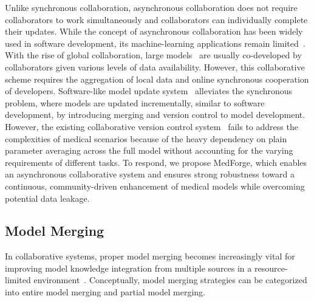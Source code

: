 Unlike synchronous collaboration, asynchronous collaboration does not require collaborators to work simultaneously and collaborators can individually complete their updates.
While the concept of asynchronous collaboration has been widely used in software development, its machine-learning applications remain limited~\cite{kandpal2023git, raffel2023building}. 
With the rise of global collaboration, large models~\cite{sahajBERT, le2023bloom} are usually co-developed by collaborators given various levels of data availability. However, this collaborative scheme requires the aggregation of local data and online synchronous cooperation of developers.
Software-like model update system~\cite{raffel2023building} alleviates the synchronous problem, where models are updated incrementally, similar to software development, by introducing merging and version control to model development.
However, the existing collaborative version control system~\cite{kandpal2023git} fails to address the complexities of medical scenarios because of the heavy dependency on plain parameter averaging across the full model without accounting for the varying requirements of different tasks.
To respond, we propose MedForge, which enables an asynchronous collaborative system and ensures strong robustness toward a continuous, community-driven enhancement of medical models while overcoming potential data leakage.



\subsection{Model Merging}
In collaborative systems, proper model merging becomes increasingly vital for improving model knowledge integration from multiple sources in a resource-limited environment~\cite{li2023deep, yang2024model, goddard2024arcee}. Conceptually, model merging strategies can be categorized into entire model merging and partial model merging.

